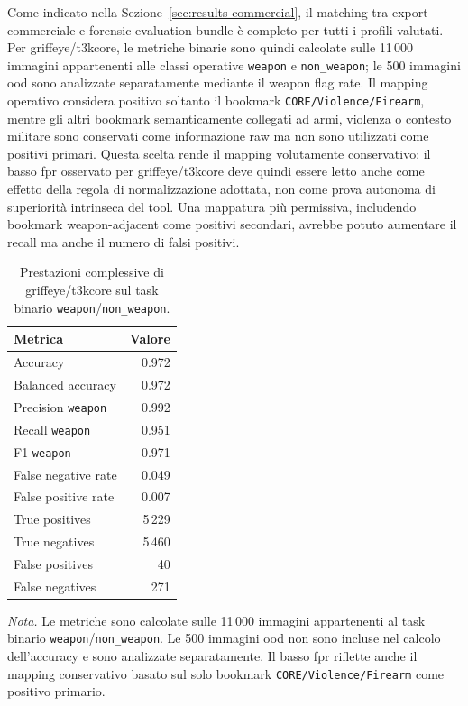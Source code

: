 Come indicato nella Sezione~\ref{sec:results-commercial}, il matching tra
export commerciale e forensic evaluation bundle è completo per tutti i profili
valutati. Per \gls{griffeye}/\gls{t3kcore}, le metriche binarie sono quindi
calcolate sulle 11\,000 immagini appartenenti alle classi operative
\texttt{weapon} e \texttt{non\_weapon}; le 500 immagini \gls{ood} sono
analizzate separatamente mediante il weapon flag rate. Il mapping operativo
considera positivo soltanto il bookmark \texttt{CORE/Violence/Firearm}, mentre
gli altri bookmark semanticamente collegati ad armi, violenza o contesto
militare sono conservati come informazione raw ma non sono utilizzati come
positivi primari. Questa scelta rende il mapping volutamente conservativo: il
basso \gls{fpr} osservato per \gls{griffeye}/\gls{t3kcore} deve quindi essere
letto anche come effetto della regola di normalizzazione adottata, non come prova
autonoma di superiorità intrinseca del tool. Una mappatura più permissiva,
includendo bookmark weapon-adjacent come positivi secondari, avrebbe potuto
aumentare il recall ma anche il numero di falsi positivi.

\begin{table}[H]
\centering
\caption{Prestazioni complessive di \gls{griffeye}/\gls{t3kcore} sul task binario \texttt{weapon}/\texttt{non\_weapon}.}
\label{tab:results-griffeye-global-metrics}
\small
\begin{tabular}{lr}
\toprule
\textbf{Metrica} & \textbf{Valore} \\
\midrule
Accuracy & 0.972 \\
Balanced accuracy & 0.972 \\
Precision \texttt{weapon} & 0.992 \\
Recall \texttt{weapon} & 0.951 \\
F1 \texttt{weapon} & 0.971 \\
False negative rate & 0.049 \\
False positive rate & 0.007 \\
True positives & 5\,229 \\
True negatives & 5\,460 \\
False positives & 40 \\
False negatives & 271 \\
\bottomrule
\end{tabular}

\vspace{0.4em}
\footnotesize
\textit{Nota.} Le metriche sono calcolate sulle 11\,000 immagini appartenenti al
task binario \texttt{weapon}/\texttt{non\_weapon}. Le 500 immagini \gls{ood} non
sono incluse nel calcolo dell'accuracy e sono analizzate separatamente. Il basso
\gls{fpr} riflette anche il mapping conservativo basato sul solo bookmark
\texttt{CORE/Violence/Firearm} come positivo primario.
\end{table}

